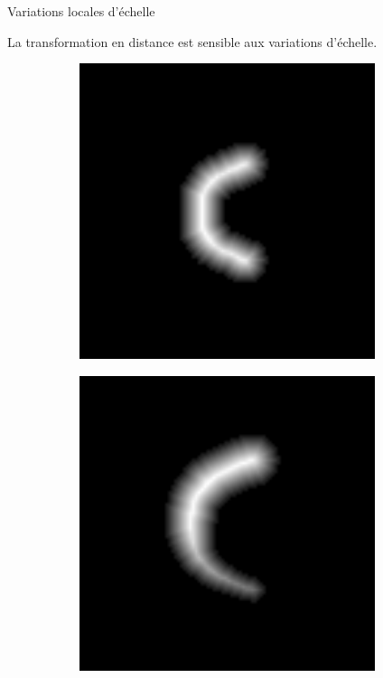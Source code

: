 \documentclass[10pt]{beamer}
\begin{document}
\begin{frame}{Variations locales d'échelle}

  La transformation en distance est sensible aux variations d'échelle.

  

  \begin{figure}[ht]
    \flushleft
    \begin{subfigure}[t]{0.2\textwidth}
      \centering
      \includegraphics[width=0.95\textwidth]{fig/prospect_reference}
      \caption{}
      \label{subfig:prospect_reference}
    \end{subfigure}%
    \begin{subfigure}[t]{0.2\textwidth}
      \centering
      \includegraphics[width=0.95\textwidth]{fig/prospect_target}

\end{subfigure}
\end{figure}
\end{frame}
\end{document}
